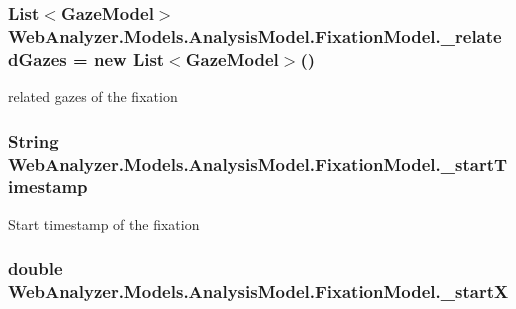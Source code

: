 \subsubsection[{\+\_\+related\+Gazes}]{\setlength{\rightskip}{0pt plus 5cm}List$<${\bf Gaze\+Model}$>$ Web\+Analyzer.\+Models.\+Analysis\+Model.\+Fixation\+Model.\+\_\+related\+Gazes = new List$<${\bf Gaze\+Model}$>$()\hspace{0.3cm}{\ttfamily [private]}}\label{class_web_analyzer_1_1_models_1_1_analysis_model_1_1_fixation_model_a9ccd1c97cb1da60a5402db3d63e18150}


related gazes of the fixation 

\hypertarget{class_web_analyzer_1_1_models_1_1_analysis_model_1_1_fixation_model_a91602e50b7f2a77eaaae995b5f605d5e}{}
\subsubsection[{\+\_\+start\+Timestamp}]{\setlength{\rightskip}{0pt plus 5cm}String Web\+Analyzer.\+Models.\+Analysis\+Model.\+Fixation\+Model.\+\_\+start\+Timestamp\hspace{0.3cm}{\ttfamily [private]}}\label{class_web_analyzer_1_1_models_1_1_analysis_model_1_1_fixation_model_a91602e50b7f2a77eaaae995b5f605d5e}


Start timestamp of the fixation 

\hypertarget{class_web_analyzer_1_1_models_1_1_analysis_model_1_1_fixation_model_aae6ca5737e71e087a0adc04a748b3d4a}{}
\subsubsection[{\+\_\+start\+X}]{\setlength{\rightskip}{0pt plus 5cm}double Web\+Analyzer.\+Models.\+Analysis\+Model.\+Fixation\+Model.\+\_\+start\+X\hspace{0.3cm}{\ttfamily [private]}}\label{class_web_analyzer_1_1_models_1_1_analysis_model_1_1_fixation_model_aae6ca5737e71e087a0adc04a748b3d4a}


